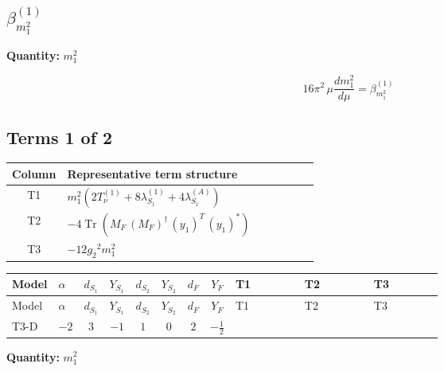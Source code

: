 \documentclass[8pt]{article}
\begin{document}
\begin{landscape}
\section*{$\beta_{m_1^2}^{(1)}$}
\noindent\textbf{Quantity: }$m_1^2$\par\smallskip
\[16\pi^2\,\mu\frac{d m_1^2}{d\mu}=\beta_{m_1^2}^{(1)}\]
\subsection*{Terms 1 of 2}
\begin{center}
\begin{tabular}{@{}c >{\raggedright\arraybackslash}p{0.82\linewidth}@{}}
\toprule
Column & Representative term structure \\
\midrule
T1 & \(\displaystyle {m_1^2} (2 T_{\nu}^{(1)}+8 {\lambda_{S_1}^{(1)}}+4 {\lambda_{S_1}^{(A)}})\) \\
\midrule
T2 & \(\displaystyle -4 \operatorname{Tr}\!\left({M_F}\,\left({M_F}\right)^{\dagger}\,\left({y_1}\right)^{T}\,\left({y_1}\right)^{*}\right)\) \\
\midrule
T3 & \(\displaystyle -12 {g_2}^2 {m_1^2}\) \\
\midrule
\bottomrule
\end{tabular}
\end{center}
\smallskip
\tiny
\begin{longtable}{@{}llcccccc >{\raggedright\arraybackslash}p{0.21\linewidth} >{\raggedright\arraybackslash}p{0.21\linewidth} >{\raggedright\arraybackslash}p{0.21\linewidth}@{}}
\toprule
Model & $\alpha$ & $d_{S_1}$ & $Y_{S_1}$ & $d_{S_2}$ & $Y_{S_2}$ & $d_F$ & $Y_F$ & T1 & T2 & T3 \\
\midrule
\endfirsthead
\toprule
Model & $\alpha$ & $d_{S_1}$ & $Y_{S_1}$ & $d_{S_2}$ & $Y_{S_2}$ & $d_F$ & $Y_F$ & T1 & T2 & T3 \\
\midrule
\endhead
T3-D & $-2$ & $3$ & $-1$ & $1$ & $0$ & $2$ & $-\frac{1}{2}$ & \scriptsize\adjustbox{max width=\linewidth}{$\begin{gathered} {m_1^2} (2 T_{\nu}^{(1)}+8 {\lambda_{S_1}^{(1)}}+4 {\lambda_{S_1}^{(A)}})\end{gathered}$} & \scriptsize\adjustbox{max width=\linewidth}{$\begin{gathered} -4 \operatorname{Tr}\!\left({M_F}\,\left({M_F}\right)^{\dagger}\,\left({y_1}\right)^{T}\,\left({y_1}\right)^{*}\right)\end{gathered}$} & \scriptsize\adjustbox{max width=\linewidth}{$\begin{gathered} -12 {g_2}^2 {m_1^2}\end{gathered}$} \\
\midrule
\bottomrule
\end{longtable}
\clearpage
\noindent\textbf{Quantity: }$m_1^2$\par\smallskip

\end{landscape}
\end{document}
